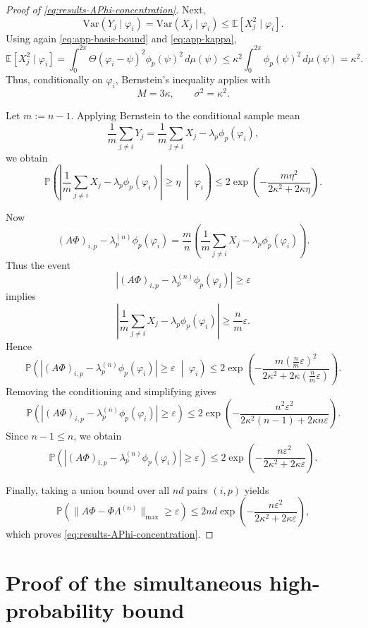 \begin{proof}[Proof of \eqref{eq:results-APhi-concentration}]
	Next,
	\[
		\mathrm{Var}(Y_j\mid \varphi_i)
		=
		\mathrm{Var}(X_j\mid \varphi_i)
		\le
		\mathbb E[X_j^2\mid \varphi_i].
	\]
	Using again \eqref{eq:app-basis-bound} and \eqref{eq:app-kappa},
	\[
		\mathbb E[X_j^2\mid \varphi_i]
		=
		\int_0^{2\pi}\Theta(\varphi_i-\psi)^2\phi_p(\psi)^2\,d\mu(\psi)
		\le
		\kappa^2 \int_0^{2\pi}\phi_p(\psi)^2\,d\mu(\psi)
		=
		\kappa^2.
	\]
	Thus, conditionally on \(\varphi_i\), Bernstein's inequality applies with
	\[
		M=3\kappa,
		\qquad
		\sigma^2=\kappa^2.
	\]

	Let \(m:=n-1\). Applying Bernstein to the conditional sample mean
	\[
		\frac1m\sum_{j\neq i}Y_j
		=
		\frac1m\sum_{j\neq i}X_j-\lambda_p\phi_p(\varphi_i),
	\]
	we obtain
	\[
		\mathbb P\!\left(
		\left|
		\frac1m\sum_{j\neq i}X_j-\lambda_p\phi_p(\varphi_i)
		\right|
		\ge \eta
		\;\middle|\;
		\varphi_i
		\right)
		\le
		2\exp\!\left(
		-\frac{m\eta^2}{2\kappa^2+2\kappa\eta}
		\right).
	\]

	Now
	\[
		(A\Phi)_{i,p}-\lambda_p^{(n)}\phi_p(\varphi_i)
		=
		\frac{m}{n}
		\left(
		\frac1m\sum_{j\neq i}X_j-\lambda_p\phi_p(\varphi_i)
		\right).
	\]
	Thus the event
	\[
		\left|
		(A\Phi)_{i,p}-\lambda_p^{(n)}\phi_p(\varphi_i)
		\right|
		\ge \varepsilon
	\]
	implies
	\[
		\left|
		\frac1m\sum_{j\neq i}X_j-\lambda_p\phi_p(\varphi_i)
		\right|
		\ge \frac{n}{m}\varepsilon.
	\]
	Hence
	\[
		\mathbb P\!\left(
		\left|
		(A\Phi)_{i,p}-\lambda_p^{(n)}\phi_p(\varphi_i)
		\right|
		\ge \varepsilon
		\;\middle|\;
		\varphi_i
		\right)
		\le
		2\exp\!\left(
		-\frac{m\left(\frac{n}{m}\varepsilon\right)^2}
		{2\kappa^2+2\kappa\left(\frac{n}{m}\varepsilon\right)}
		\right).
	\]
	Removing the conditioning and simplifying gives
	\[
		\mathbb P\!\left(
		\left|
		(A\Phi)_{i,p}-\lambda_p^{(n)}\phi_p(\varphi_i)
		\right|
		\ge \varepsilon
		\right)
		\le
		2\exp\!\left(
		-\frac{n^2\varepsilon^2}{2\kappa^2(n-1)+2\kappa n\varepsilon}
		\right).
	\]
	Since \(n-1\le n\), we obtain
	\[
		\mathbb P\!\left(
		\left|
		(A\Phi)_{i,p}-\lambda_p^{(n)}\phi_p(\varphi_i)
		\right|
		\ge \varepsilon
		\right)
		\le
		2\exp\!\left(
		-\frac{n\varepsilon^2}{2\kappa^2+2\kappa\varepsilon}
		\right).
	\]

	Finally, taking a union bound over all \(nd\) pairs \((i,p)\) yields
	\[
		\mathbb P\!\left(\|A\Phi-\Phi\Lambda^{(n)}\|_{\max}\ge \varepsilon\right)
		\le
		2nd\exp\!\left(-\frac{n\varepsilon^2}{2\kappa^2+2\kappa\varepsilon}\right),
	\]
	which proves \eqref{eq:results-APhi-concentration}.
\end{proof}

\section{Proof of the simultaneous high-probability bound}
\label{sec:app-simultaneous-proof}

